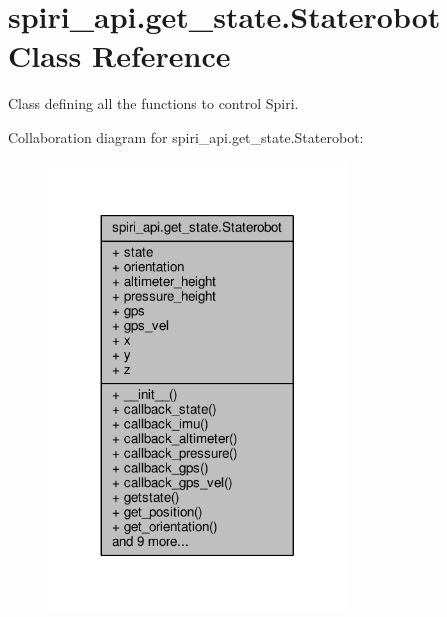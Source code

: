 \hypertarget{classspiri__api_1_1get__state_1_1_staterobot}{\section{spiri\-\_\-api.\-get\-\_\-state.\-Staterobot Class Reference}
\label{classspiri__api_1_1get__state_1_1_staterobot}
}


Class defining all the functions to control Spiri.  




Collaboration diagram for spiri\-\_\-api.\-get\-\_\-state.\-Staterobot\-:
\nopagebreak
\begin{figure}[H]
\begin{center}
\leavevmode
\includegraphics[width=224pt]{classspiri__api_1_1get__state_1_1_staterobot__coll__graph}
\end{center}
\end{figure}
